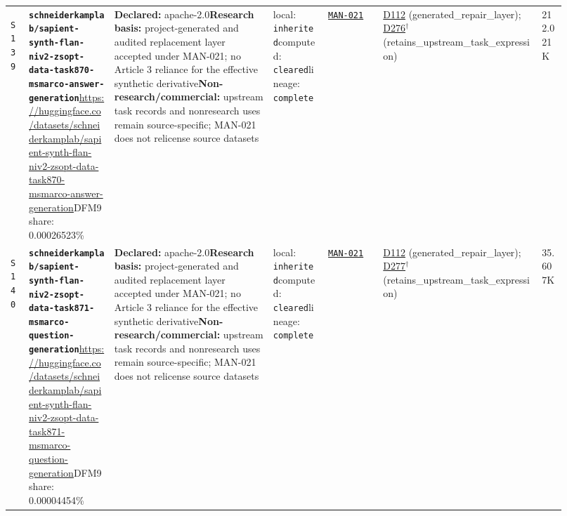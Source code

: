 \documentclass[9pt,a4paper]{article}
\newcommand{\srcid}[1]{\hypertarget{src:#1}{\texttt{#1}}}
\begin{document}
\begin{landscape}
\begin{longtable}{@{}L{0.03\linewidth}L{0.14\linewidth}L{0.26\linewidth}L{0.09\linewidth}L{0.09\linewidth}L{0.265\linewidth}L{0.045\linewidth}@{}}
\srcid{S139} & \textbf{\nolinkurl{schneiderkamplab/sapient-synth-flan-niv2-zsopt-data-task870-msmarco-answer-generation}}\newline \url{https://huggingface.co/datasets/schneiderkamplab/sapient-synth-flan-niv2-zsopt-data-task870-msmarco-answer-generation}\newline DFM9 share: 0.00026523\% & \textbf{Declared:} apache-2.0\newline \textbf{Research basis:} project-generated and audited replacement layer accepted under MAN-021; no Article 3 reliance for the effective synthetic derivative\newline \textbf{Non-research/commercial:} upstream task records and nonresearch uses remain source-specific; MAN-021 does not relicense source datasets & local: \texttt{inherited}\newline computed: \texttt{cleared}\newline lineage: \texttt{complete} & \hyperlink{manual:MAN-021}{\texttt{MAN-021}} & \hyperlink{dep:D112}{D112} (generated\_repair\_layer); \hyperlink{dep:D276}{D276}$^{\dagger}$ (retains\_upstream\_task\_expression) & 212.021K \\
\srcid{S140} & \textbf{\nolinkurl{schneiderkamplab/sapient-synth-flan-niv2-zsopt-data-task871-msmarco-question-generation}}\newline \url{https://huggingface.co/datasets/schneiderkamplab/sapient-synth-flan-niv2-zsopt-data-task871-msmarco-question-generation}\newline DFM9 share: 0.00004454\% & \textbf{Declared:} apache-2.0\newline \textbf{Research basis:} project-generated and audited replacement layer accepted under MAN-021; no Article 3 reliance for the effective synthetic derivative\newline \textbf{Non-research/commercial:} upstream task records and nonresearch uses remain source-specific; MAN-021 does not relicense source datasets & local: \texttt{inherited}\newline computed: \texttt{cleared}\newline lineage: \texttt{complete} & \hyperlink{manual:MAN-021}{\texttt{MAN-021}} & \hyperlink{dep:D112}{D112} (generated\_repair\_layer); \hyperlink{dep:D277}{D277}$^{\dagger}$ (retains\_upstream\_task\_expression) & 35.607K \\

\end{longtable}
\end{landscape}
\end{document}
